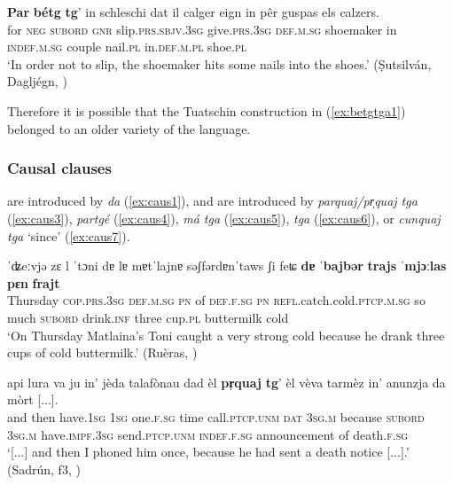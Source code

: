 \ea\label{ex:betgtga2}
\gll  \textbf{Par} \textbf{bétg} \textbf{tg}' in schleschi dat il calger eign in pêr guspas els calzers.\\
     for \textsc{neg} \textsc{subord} \textsc{gnr} slip.\textsc{prs.sbjv.3sg} give.\textsc{prs.3sg} \textsc{def.m.sg} shoemaker in \textsc{indef.m.sg} couple nail.\textsc{pl} in.\textsc{def.m.pl} shoe.\textsc{pl}\\
\glt `In order not to slip, the shoemaker hits some nails into the shoes.' (Ṣutsilván, Dagljégn, )
\z

Therefore it is possible that the Tuatschin construction in (\ref{ex:betgtga1}) belonged to an older variety of the language.


\subsubsection{Causal clauses}\label{sec:6.2.2.4}
 are introduced by \textit{da} (\ref{ex:caus1}), and  are introduced by \textit{parquaj/pr̩quaj tga} (\ref{ex:caus3}), \textit{partgé} (\ref{ex:caus4}), \textit{má tga} (\ref{ex:caus5}), \textit{tga} (\ref{ex:caus6}), or \textit{cunquaj tga} `since' (\ref{ex:caus7}).
 
 \ea
 \label{ex:caus1}
  \gll ˈʥeːvjǝ zɛ l ˈtɔni dɐ lɐ mɐtˈlajnɐ sǝʃfǝrdɐnˈtaws ʃi feʨ \textbf{dɐ} ˈ\textbf{bajbǝr} \textbf{trajs} \textbf{ˈmjɔːlas} \textbf{pɛn} \textbf{frajt}\\
 Thursday \textsc{cop.prs.3sg} \textsc{def.m.sg} \textsc{pn} of \textsc{def.f.sg} \textsc{pn} \textsc{refl}.catch.cold.\textsc{ptcp.m.sg} so much \textsc{subord} drink.\textsc{inf} three cup.\textsc{pl} buttermilk cold\\
 \glt `On Thursday Matlaina’s Toni caught a very strong cold because he drank three cups of cold buttermilk.' (Ruèras, \citealt[9]{Valär2013b})
 \z

\ea
\label{ex:caus3}
\gll  [...] api lura va ju in’ jèda talafònau dad èl \textbf{pr̩quaj} \textbf{tg}' èl vèva tarmèz in’ anunzja da mòrt [...].\\
{} and then have.\textsc{1sg}  \textsc{1sg} one.\textsc{f.sg} time call.\textsc{ptcp.unm} \textsc{dat} \textsc{3sg.m} because \textsc{subord} \textsc{3sg.m} have.\textsc{impf.3sg} send.\textsc{ptcp.unm} \textsc{indef.f.sg} announcement of death.\textsc{f.sg}\\ 
\glt `[...] and then I phoned him once, because he had sent a death notice [...].' (Sadrún, f3, )
\z

